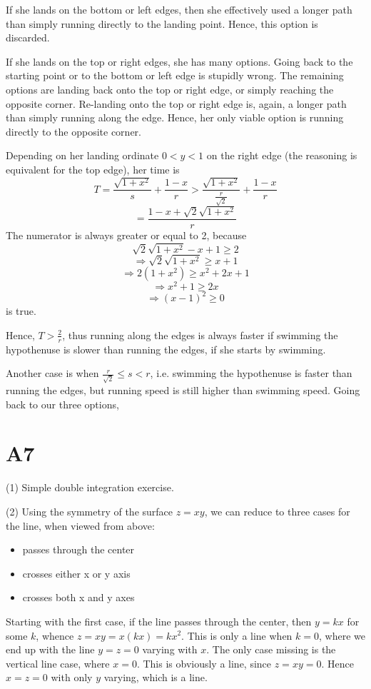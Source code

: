 \documentclass{book}
\begin{document}
If she lands on the bottom or left edges, then she effectively used a longer path than simply running directly to the landing point. Hence, this option is discarded.

If she lands on the top or right edges, she has many options. Going back to the starting point or to the bottom or left edge is stupidly wrong. The remaining options are landing back onto the top or right edge, or simply reaching the opposite corner. Re-landing onto the top or right edge is, again, a longer path than simply running along the edge. Hence, her only viable option is running directly to the opposite corner.

Depending on her landing ordinate $0 < y < 1$ on the right edge (the reasoning is equivalent for the top edge), her time is
$$T = \frac{\sqrt{1 + x^2}}{s} + \frac{1 - x}{r} > \frac{\sqrt{1 + x^2}}{\frac{r}{\sqrt{2}}} + \frac{1 - x}{r}$$
$$= \frac{1 - x + \sqrt{2}\sqrt{1 + x^2}}{r}$$
The numerator is always greater or equal to 2, because
$$\sqrt{2}\sqrt{1 + x^2} - x + 1 \geq 2$$
$$\Rightarrow \sqrt{2}\sqrt{1 + x^2} \geq x + 1$$
$$\Rightarrow 2 (1 + x^2) \geq x^2 + 2x + 1$$
$$\Rightarrow x^2 + 1 \geq 2x$$
$$\Rightarrow (x - 1)^2 \geq 0$$
is true.

Hence, $T > \frac{2}{r}$, thus running along the edges is always faster if swimming the hypothenuse is slower than running the edges, if she starts by swimming.

Another case is when $\frac{r}{\sqrt{2}} \leq s < r$, i.e. swimming the hypothenuse is faster than running the edges, but running speed is still higher than swimming speed. Going back to our three options,

\section*{A7}
(1)
Simple double integration exercise.

\noindent
(2)
Using the symmetry of the surface $z = xy$, we can reduce to three cases for the line, when viewed from above:
\begin{itemize}
  \item passes through the center
  \item crosses either x or y axis
  \item crosses both x and y axes
\end{itemize}

Starting with the first case, if the line passes through the center, then $y = kx$ for some $k$, whence $z = xy = x(kx) = kx^2$. This is only a line when $k = 0$, where we end up with the line $y = z = 0$ varying with $x$. The only case missing is the vertical line case, where $x = 0$. This is obviously a line, since $z = xy = 0$. Hence $x = z = 0$ with only $y$ varying, which is a line.
\end{document}
